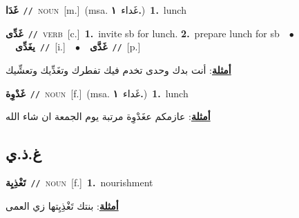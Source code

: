 \documentclass[10pt,a4paper,twoside]{article} %
\begin{document}
\begin{multicols}{2}
{{{{{{\setlength\topsep{0pt}\textbf{\foreignlanguage{arabic}{غَدَا}}\ {\color{gray}\texttt{//}\color{black}}\ \textsc{noun}\ [m.]\ \color{gray}(msa. \foreignlanguage{arabic}{غَداء}~\foreignlanguage{arabic}{\textbf{١.}})\color{black}\ \textbf{1.}~lunch\ 

{\setlength\topsep{0pt}\textbf{\foreignlanguage{arabic}{غَدِّى}}\ {\color{gray}\texttt{//}\color{black}}\ \textsc{verb}\ [c.]\ \textbf{1.}~invite sb for lunch.  \textbf{2.}~prepare lunch for sb\ \ $\bullet$\ \ \setlength\topsep{0pt}\textbf{\foreignlanguage{arabic}{يغَدِّى}}\ {\color{gray}\texttt{//}\color{black}}\ [i.]\ \ $\bullet$\ \ \setlength\topsep{0pt}\textbf{\foreignlanguage{arabic}{غَدَّى}}\ {\color{gray}\texttt{//}\color{black}}\ [p.]\  \begin{flushright}\color{gray}\foreignlanguage{arabic}{\textbf{\underline{\foreignlanguage{arabic}{أمثلة}}}: أنت بدك وحدى تخدم فيك تفطرك وتغَدِّيك وتعشِّيك}\end{flushright}\color{black}} \vspace{2mm}

{\setlength\topsep{0pt}\textbf{\foreignlanguage{arabic}{غَدْوِة}}\ {\color{gray}\texttt{//}\color{black}}\ \textsc{noun}\ [f.]\ \color{gray}(msa. \foreignlanguage{arabic}{غَداء}~\foreignlanguage{arabic}{\textbf{١.}})\color{black}\ \textbf{1.}~lunch\  \begin{flushright}\color{gray}\foreignlanguage{arabic}{\textbf{\underline{\foreignlanguage{arabic}{أمثلة}}}: عازمكم عغَدْوِة مرتبة يوم الجمعة ان شاء الله}\end{flushright}\color{black}} \vspace{2mm}

\vspace{-3mm}
\subsection*{\color{blue}\foreignlanguage{arabic}{غ.ذ.ي}\color{blue}{}} 

{\setlength\topsep{0pt}\textbf{\foreignlanguage{arabic}{تَغْذِيِة}}\ {\color{gray}\texttt{//}\color{black}}\ \textsc{noun}\ [f.]\ \textbf{1.}~nourishment\  \begin{flushright}\color{gray}\foreignlanguage{arabic}{\textbf{\underline{\foreignlanguage{arabic}{أمثلة}}}: بنتك تَغْذِيِتها زي العمى}\end{flushright}\color{black}} \vspace{2mm}

}}}}}}
\end{multicols}
\end{document}

